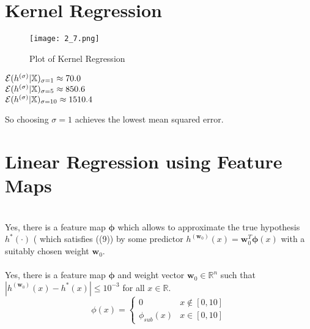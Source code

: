 \documentclass[article,11pt]{article}
\begin{document}
\section{Kernel Regression}
\begin{figure}[H]
	\centering
	\captionsetup{justification=centering}
	\texttt{[image: 2\_7.png]}
	\caption{Plot of Kernel Regression}
\end{figure}
\begin{center}

$\mathcal{E}(h^{(\sigma)}| \mathbb{X})_{\sigma=1} \approx 70.0	$\\
$\mathcal{E}(h^{(\sigma)}| \mathbb{X})_{\sigma=5} \approx 850.6	$\\
$\mathcal{E}(h^{(\sigma)}| \mathbb{X})_{\sigma=10} \approx 1510.4 $\\
\end{center}
So choosing $\sigma=1$ achieves the lowest mean squared error.
\newpage
\section{Linear Regression using Feature Maps}
\\
Yes, there is a feature map ${\bm \phi}$ which allows to approximate the true hypothesis $h^{*}(\cdot)$ (
which satisfies ((9)) by some predictor $h^{(\mathbf{w}_{0})}(x) =  \mathbf{w}_{0}^{T} {\bm \phi}(x)$ with a suitably chosen weight $\mathbf{w}_{0}$. \\ \\
Yes, there is a feature map ${\bm \phi}$ and weight vector $\mathbf{w}_{0} \in \mathbb{R}^{n}$ such that $|h^{(\mathbf{w}_{0})}(x) - h^{*}(x)| \leq 10^{-3}$ for all $x \in \mathbb{R}$.\\

\begin{equation}
\phi(x)=
\begin{cases}
0& x \notin [0,10]\\
\phi_{sub}(x)& x \in [0,10]
\end{cases}
\end{equation}
\end{document}
